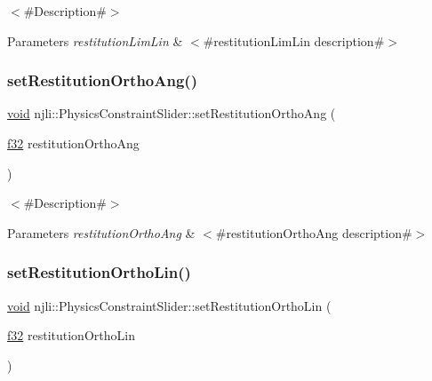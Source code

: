 $<$\#\+Description\#$>$


\begin{DoxyParams}{Parameters}
{\em restitution\+Lim\+Lin} & $<$\#restitution\+Lim\+Lin description\#$>$ \\
\hline
\end{DoxyParams}
\mbox{\label{classnjli_1_1_physics_constraint_slider_a4fd93409b01a00f7307a3483155d1a8f}} 
\subsubsection{\texorpdfstring{set\+Restitution\+Ortho\+Ang()}{setRestitutionOrthoAng()}}
{\footnotesize\ttfamily \mbox{\hyperlink{_thread_8h_af1e856da2e658414cb2456cb6f7ebc66}{void}} njli\+::\+Physics\+Constraint\+Slider\+::set\+Restitution\+Ortho\+Ang (\begin{DoxyParamCaption}\item[{\mbox{\hyperlink{_util_8h_a5f6906312a689f27d70e9d086649d3fd}{f32}}}]{restitution\+Ortho\+Ang }\end{DoxyParamCaption})}

$<$\#\+Description\#$>$


\begin{DoxyParams}{Parameters}
{\em restitution\+Ortho\+Ang} & $<$\#restitution\+Ortho\+Ang description\#$>$ \\
\hline
\end{DoxyParams}
\mbox{\label{classnjli_1_1_physics_constraint_slider_a46d8a90d1a17e728e2836d020204968d}} 
\subsubsection{\texorpdfstring{set\+Restitution\+Ortho\+Lin()}{setRestitutionOrthoLin()}}
{\footnotesize\ttfamily \mbox{\hyperlink{_thread_8h_af1e856da2e658414cb2456cb6f7ebc66}{void}} njli\+::\+Physics\+Constraint\+Slider\+::set\+Restitution\+Ortho\+Lin (\begin{DoxyParamCaption}\item[{\mbox{\hyperlink{_util_8h_a5f6906312a689f27d70e9d086649d3fd}{f32}}}]{restitution\+Ortho\+Lin }\end{DoxyParamCaption})}

